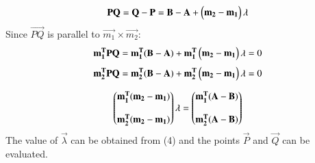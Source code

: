 \documentclass[journal,12pt,twocolumn]{IEEEtran}
\begin{document}
\noindent
\begin{align}
	\mathbf{PQ} = \mathbf{Q}-\mathbf{P} = \mathbf{B}-\mathbf{A} 
	                   + \begin{pmatrix}\mathbf{m_2}-\mathbf{m_1}\end{pmatrix}\mathbf{\lambda}
\end{align}
\noindent
Since $\vec{PQ}$ is parallel to $\vec{m_1} \times \vec{m_2}$:
\begin{align}
	\mathbf{m_1^T}\mathbf{PQ} = \mathbf{m_1^T}\mathbf{(B-A)} + \mathbf{m_1^T}\begin{pmatrix}\mathbf{m_2} - \mathbf{m_1}\end{pmatrix}\mathbf{\lambda}=0
\end{align}
\begin{align}
        \mathbf{m_2^T}\mathbf{PQ} = \mathbf{m_2^T}\mathbf{(B-A)} + \mathbf{m_2^T}\begin{pmatrix}\mathbf{m_2} - \mathbf{m_1}\end{pmatrix}\mathbf{\lambda}=0
\end{align}

\begin{align}
	\begin{pmatrix}\mathbf{m_1^T(m_2 - m_1)} \\ \\ \mathbf{m_2^T(m_2 - m_1)}\end{pmatrix}\mathbf{\lambda} = \begin{pmatrix}\mathbf{m_1^T(A - B)} \\ \\ \mathbf{m_2^T(A - B)}\end{pmatrix}
\end{align}
The value of $\vec{\lambda}$ can be obtained from (4) and the points $\vec{P}$ and $\vec{Q}$ can be evaluated. 
\end{document}
